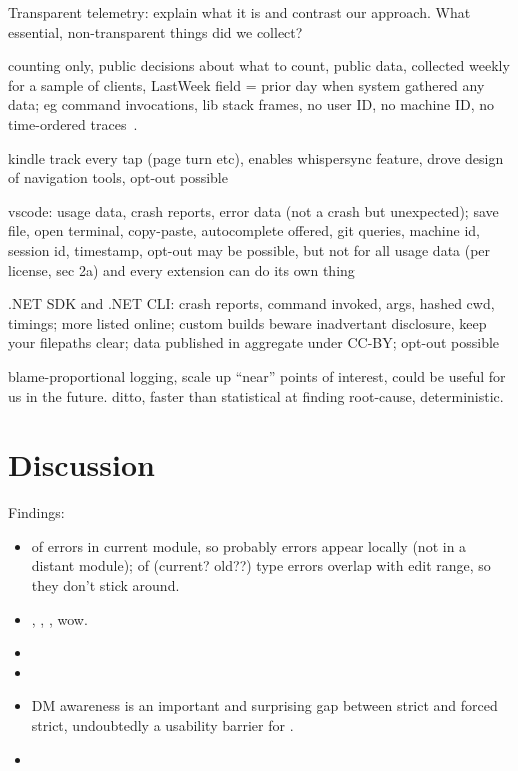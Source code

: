\documentclass[english,submission,cleveref]{programming}
\begin{document}
Transparent telemetry: explain what it is and contrast our approach.
What essential, non-transparent things did we collect?

counting only, public decisions about what to count, public data,
collected weekly for a sample of clients, LastWeek field = prior day when
system gathered any data;
eg command invocations, lib stack frames, 
no user ID, no machine ID,
no time-ordered traces~\cite{transparent-telemetry}.

kindle track every tap (page turn etc),
enables whispersync feature,
drove design of navigation tools,
opt-out possible~\cite{kindle-telemetry}

vscode: usage data, crash reports, error data (not a crash but unexpected);
save file, open terminal, copy-paste, autocomplete offered, git queries, machine id,
session id, timestamp,
opt-out may be possible, but not for all usage data (per license, sec 2a) and
every extension can do its own thing~\cite{vscode-telemetry}

.NET SDK and .NET CLI:
crash reports, command invoked, args, hashed cwd, timings;
more listed online;
custom builds beware inadvertant disclosure, keep your filepaths clear;
data published in aggregate under CC-BY;
opt-out possible~\cite{dotnet-telemetry}


\cite{lnsmc-usenix-2018} blame-proportional logging,
scale up ``near'' points of interest,
could be useful for us in the future.
\cite{fnm-sigmod-2020} ditto, faster than statistical at finding root-cause,
deterministic.



\section{Discussion}
\label{s:conclusion}
\label{s:discussion}

Findings:

\begin{itemize}
  \item
     of errors in current module, so probably errors appear locally (not in a distant module);
     of (current? old??) type errors overlap with edit range, so they don't stick around.
  \item
     \mnocheck{},   \mnonstrict{},   \mstrict{}, wow.
  \item
  \item
  \item
    DM awareness is an important and surprising gap between strict
    and forced strict, undoubtedly a usability barrier for \mstrict{}.
  \item
\end{itemize}
\end{document}
